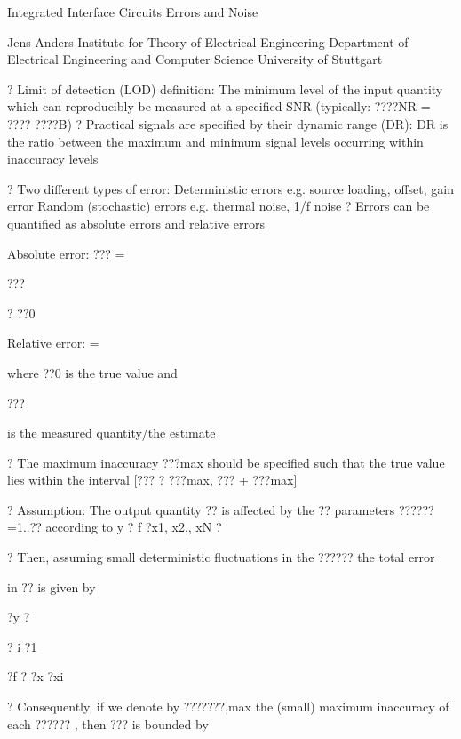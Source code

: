 \documentclass[2pt,landscape]{article}
\begin{document}
\begin{multicols*}{5}
Integrated Interface Circuits \textbullet 
Errors and Noise


Jens Anders
Institute for Theory of Electrical Engineering 
Department of Electrical Engineering and Computer 
Science
University of Stuttgart



?	Limit of detection (LOD) definition:
The minimum level of the input quantity which can reproducibly 
be measured at a specified SNR (typically: ????NR = ???? ????B)
?	Practical signals are specified by their dynamic range (DR):
DR is the ratio between the maximum and minimum signal levels 
occurring within inaccuracy levels



?	Two different types of error:
\textbullet 	Deterministic errors
e.g. source loading, offset, gain error
\textbullet 	Random (stochastic) errors
e.g. thermal noise, 1/f noise
?	Errors can be quantified as absolute errors and relative errors




Absolute error: ??? =


???


? ??0




Relative error:	=




where ??0 is the true value and


???


is the measured quantity/the 
estimate



?	The maximum inaccuracy ???max should be specified such that the
true value lies within the interval [??? ? ???max, ??? + ???max]






?	Assumption:
The output quantity ?? is affected by the ?? parameters ??????=1..?? according 
to
y ? f ?x1, x2,\textbullet , xN ?

?	Then, assuming small deterministic fluctuations in the ?????? the total error


in ?? is given by


?y ?




?
i ?1


?f ? ?x
?xi


?	Consequently, if we denote by ???????,max  the (small) maximum inaccuracy 
of each ?????? , then ??? is bounded by




\end{multicols*}
\end{document}
